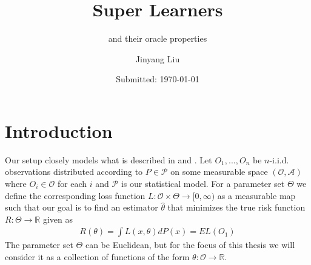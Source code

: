 \documentclass[11pt, a4paper]{article}
\author{Jinyang Liu}
\title{Super Learners}
\subtitle{and their oracle properties}
\date{Submitted: \today}
\theoremstyle{definition}
\theoremstyle{remark}
\begin{document}
\begingroup
    \selectfont
    \maketitle
    \tableofcontents
    \newpage
\endgroup


\section{Introduction}
Our setup closely models what is described in \cite{vaart06} and \cite{laan03}. 
Let $ O_1, ..., O_n $ be $ n $-i.i.d. observations distributed according to $ P \in \mathcal{P} $ on some measurable space $ (\mathcal{O}, \mathcal{A}) $ where $ O_{i} \in \mathcal{O} $ for each $ i $ and $ \mathcal{P} $ is our statistical model. For a parameter set $ \Theta $ we define the corresponding loss function $ L : \mathcal{O} \times \Theta \to [0, \infty) $ as a measurable map such that our goal is to find an estimator $ \hat{\theta}  $ that minimizes the true risk function $ R: \Theta \to \mathbb{R} $ given as
\begin{align*}
    R(\theta) = \int L(x, \theta)  dP(x) = EL(O_1) 
\end{align*}
The parameter set $ \Theta $ can be Euclidean, but for the focus of this thesis we will consider it as a collection of functions of the form $ \theta : \mathcal{O} \to \mathbb{R} $. 
\end{document}
